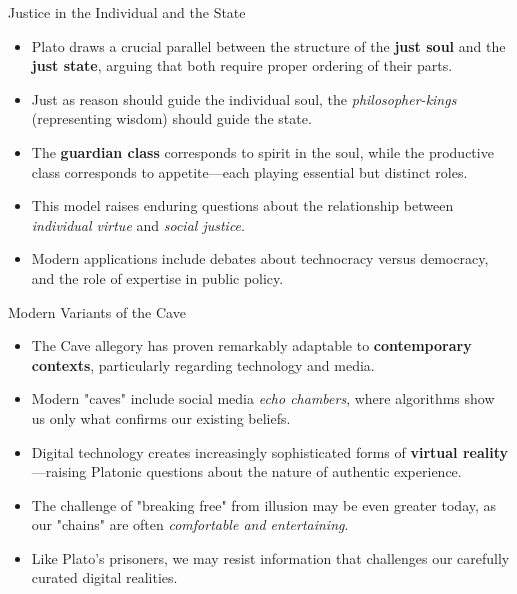 \documentclass[aspectratio=169]{beamer}
\begin{document}
\begin{frame}{Justice in the Individual and the State}
\begin{itemize}
\item Plato draws a crucial parallel between the structure of the \textbf{just soul} and the \textbf{just state}, arguing that both require proper ordering of their parts.
\item Just as reason should guide the individual soul, the \emph{philosopher-kings} (representing wisdom) should guide the state.
\item The \textbf{guardian class} corresponds to spirit in the soul, while the productive class corresponds to appetite—each playing essential but distinct roles.
\item This model raises enduring questions about the relationship between \emph{individual virtue} and \emph{social justice}.
\item Modern applications include debates about technocracy versus democracy, and the role of expertise in public policy.
\end{itemize}


\end{frame}
\begin{frame}{Modern Variants of the Cave}
\begin{itemize}
\item The Cave allegory has proven remarkably adaptable to \textbf{contemporary contexts}, particularly regarding technology and media.
\item Modern "caves" include social media \emph{echo chambers}, where algorithms show us only what confirms our existing beliefs.
\item Digital technology creates increasingly sophisticated forms of \textbf{virtual reality}—raising Platonic questions about the nature of authentic experience.
\item The challenge of "breaking free" from illusion may be even greater today, as our "chains" are often \emph{comfortable and entertaining}.
\item Like Plato's prisoners, we may resist information that challenges our carefully curated digital realities.
\end{itemize}
\end{frame}
\end{document}
